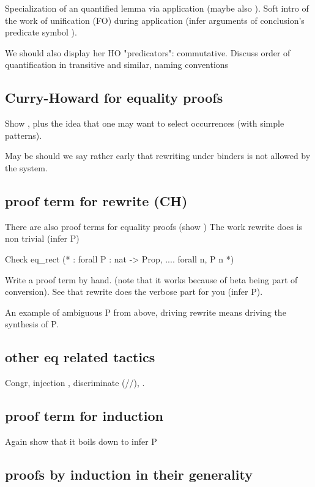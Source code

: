 Specialization of an quantified lemma via application (maybe also
).
Soft intro of the work of unification (FO) during application (infer
arguments of conclusion's predicate symbol ).

We should also display her  HO "predicators": commutative.  Discuss
order of quantification in transitive and similar, naming conventions

\subsection{Curry-Howard for equality proofs}


Show , plus the idea that one may want to select
occurrences (with simple patterns).


May be should we say rather early that rewriting under binders is not
allowed by the system.

\subsection{proof term for rewrite (CH)}

There are also proof terms for equality proofs (show )
The work rewrite does is non trivial (infer P)

\begin{coq}{}
Check eq_rect (* : forall P : nat -> Prop, .... forall n, P n *)
\end{coq}

Write a proof term by hand.
(note that it works because of beta being part of conversion).
See that rewrite does the verbose part for you (infer P).

An example of ambiguous P from above, driving rewrite means driving the
synthesis of P.

\subsection{other eq related tactics}

Congr, injection \C{[= ]}, discriminate (//), \C{->}.


\subsection{proof term for induction}

Again show that it boils down to infer P


\subsection{proofs by induction in their generality}

